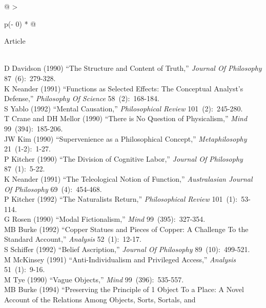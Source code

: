 \documentclass[
  10pt,
  letterpaper,
  DIV=11,
  numbers=noendperiod,
  twoside]{scrartcl}
\begin{document}
\begin{longtable}[]{@{}
  >{\raggedright\arraybackslash}p{(\columnwidth - 0\tabcolsep) * }@{}}

\caption{\label{tbl-early-1990s}The twenty articles from 1990-1994 most
widely cited at the time.}

\tabularnewline

\toprule\noalign{}
\begin{minipage}[b]{\linewidth}\raggedright
Article
\end{minipage} \\
\midrule\noalign{}
\endhead
\bottomrule\noalign{}
\endlastfoot
D Davidson (1990) ``The Structure and Content of Truth,'' \emph{Journal
Of Philosophy} 87~(6):~279-328. \\
K Neander (1991) ``Functions as Selected Effects: The Conceptual
Analyst's Defense,'' \emph{Philosophy Of Science} 58~(2):~168-184. \\
S Yablo (1992) ``Mental Causation,'' \emph{Philosophical Review}
101~(2):~245-280. \\
T Crane and DH Mellor (1990) ``There is No Question of Physicalism,''
\emph{Mind} 99~(394):~185-206. \\
JW Kim (1990) ``Supervenience as a Philosophical Concept,''
\emph{Metaphilosophy} 21~(1-2):~1-27. \\
P Kitcher (1990) ``The Division of Cognitive Labor,'' \emph{Journal Of
Philosophy} 87~(1):~5-22. \\
K Neander (1991) ``The Teleological Notion of Function,''
\emph{Australasian Journal Of Philosophy} 69~(4):~454-468. \\
P Kitcher (1992) ``The Naturalists Return,'' \emph{Philosophical Review}
101~(1):~53-114. \\
G Rosen (1990) ``Modal Fictionalism,'' \emph{Mind} 99~(395):~327-354. \\
MB Burke (1992) ``Copper Statues and Pieces of Copper: A Challenge To
the Standard Account,'' \emph{Analysis} 52~(1):~12-17. \\
S Schiffer (1992) ``Belief Ascription,'' \emph{Journal Of Philosophy}
89~(10):~499-521. \\
M McKinsey (1991) ``Anti-Individualism and Privileged Access,''
\emph{Analysis} 51~(1):~9-16. \\
M Tye (1990) ``Vague Objects,'' \emph{Mind} 99~(396):~535-557. \\
MB Burke (1994) ``Preserving the Principle of 1 Object To a Place: A
Novel Account of the Relations Among Objects, Sorts, Sortals, and

\end{longtable}
\end{document}
